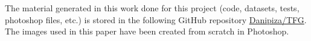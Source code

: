 The material generated in this work done for this project (code, datasets, tests, photoshop files, etc.) is stored in the following GitHub repository \href{https://github.com/Danipiza/TFG}{Danipiza/TFG}. The images used in this paper have been created from scratch in Photoshop.















